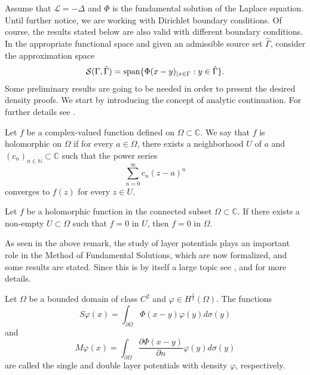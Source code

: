 Assume that \(\mathcal{L} = -\Delta\) and \(\Phi\) is the fundamental solution of the Laplace equation. Until further notice, we are working with Dirichlet boundary conditions. Of course, the results stated below are also valid with different boundary conditions. In the appropriate functional space and given an admissible source set \(\hat{\Gamma}\), consider the approximation space
\[
    \mathcal{S}(\Gamma, \hat{\Gamma}) = \operatorname{span}\{\Phi(x-y)_{|x \in \Gamma} : y \in \hat{\Gamma}\}.
\]
Some preliminary results are going to be needed in order to present the desired density proofs.
We start by introducing the concept of analytic continuation. For further details see \cite{narasimhan2012complex}.
\begin{definition}
    Let \(f\) be a complex-valued function defined on \(\Omega \subset \mathbb{C}\). We say that \(f\) is holomorphic on \(\Omega\) if for every \(a \in \Omega\), there exists a neighborhood \(U\) of \(a\) and \((c_n)_{n \in \mathbb{N}} \subset \mathbb{C}\) such that the power series
    \[
        \sum_{n=0}^{\infty} c_n(z-a)^n
    \]
    converges to \(f(z)\) for every \(z \in U\).
\end{definition}
\begin{theorem}\label{ana_cont}
    Let \(f\) be a holomorphic function in the connected subset \(\Omega \subset \mathbb{C}\). If there exists a non-empty \(U \subset \Omega\) such that \(f = 0\) in \(U\), then \(f = 0\) in \(\Omega\).
\end{theorem}
As seen in the above remark, the study of layer potentials plays an important role in the Method of Fundamental Solutions, which are now formalized, and some results are stated. Since this is by itself a large topic see \cite{chen2010boundary}, \cite{kress2013linear} and \cite{colton2013integral} for more details.
\begin{definition}\label{definition_single_and_double_layer_potentials}
    Let \(\Omega\) be a bounded domain of class \(C^2\) and \(\varphi \in H^\frac{1}{2}(\Omega)\). The functions
    \[
        S\varphi(x) = \int_{\partial\Omega} \Phi(x-y)\varphi(y) d\sigma(y)
    \]
    and
    \[
        M\varphi(x) = \int_{\partial\Omega} \frac{\partial \Phi(x-y)}{\partial n}\varphi(y) d\sigma(y)
    \]
    are called the single and double layer potentials with density \(\varphi\), respectively.
\end{definition}
